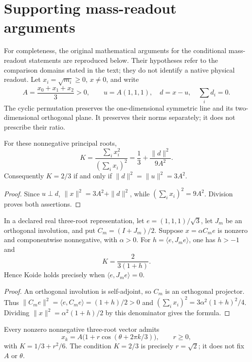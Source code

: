 \section{Supporting mass-readout arguments}
For completeness, the original mathematical arguments for the conditional mass-readout statements are reproduced below. Their hypotheses refer to the comparison domains stated in the text; they do not identify a native physical readout.
Let $x_i=\sqrt{m_i}\geq0$, $x\ne0$, and write
\[
 A=\frac{x_0+x_1+x_2}{3}>0,\qquad
 u=A(1,1,1),\quad d=x-u,\quad \sum_i d_i=0.
\]
The cyclic permutation preserves the one-dimensional symmetric line
and its two-dimensional orthogonal plane. It preserves their norms
separately; it does not prescribe their ratio.
\begin{proposition}
\label{v480:koide-equal-norm}
For these nonnegative principal roots,
\[
 K=\frac{\sum_i x_i^2}{(\sum_i x_i)^2}
   =\frac13+\frac{\|d\|^2}{9A^2}.
\]
Consequently $K=2/3$ if and only if
$\|d\|^2=\|u\|^2=3A^2$.
\end{proposition}
\begin{proof}
Since $u\perp d$, $\|x\|^2=3A^2+\|d\|^2$, while
$(\sum_i x_i)^2=9A^2$. Division proves both assertions.
\end{proof}
\begin{proposition}
\label{v480:koide-hc-mixing}
In a declared real three-root representation, let
$e=(1,1,1)/\sqrt3$, let $J_m$ be an orthogonal involution, and put
$C_m=(I+J_m)/2$. Suppose $x=\alpha C_m e$ is nonzero and
componentwise nonnegative, with $\alpha>0$. For
$h=\langle e,J_m e\rangle$, one has $h>-1$ and
\[
 K=\frac{2}{3(1+h)}.
\]
Hence Koide holds precisely when $\langle e,J_m e\rangle=0$.
\end{proposition}
\begin{proof}
An orthogonal involution is self-adjoint, so $C_m$ is an
orthogonal projector. Thus
$\|C_m e\|^2=\langle e,C_m e\rangle=(1+h)/2>0$ and
$(\sum_i x_i)^2=3\alpha^2(1+h)^2/4$. Dividing
$\|x\|^2=\alpha^2(1+h)/2$ by this denominator gives the formula.
\end{proof}
\begin{proposition}
\label{v480:koide-radius-phase}
Every nonzero nonnegative three-root vector admits
\[
 x_k=A\bigl(1+r\cos(\theta+2\pi k/3)\bigr),\qquad r\geq0,
\]
with $K=1/3+r^2/6$. The condition $K=2/3$ is precisely $r=\sqrt2$;
it does not fix $A$ or $\theta$.
\end{proposition}
